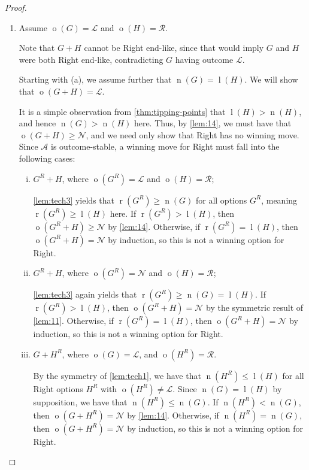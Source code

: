\documentclass[11pt]{article}
\theoremstyle{definition}
\DeclareMathOperator{\outcome}{o}
\newcommand{\set}[1]{\mathcal{#1}}
\DeclareMathOperator{\ltp}{l}
\DeclareMathOperator{\ntp}{n}
\DeclareMathOperator{\rtp}{r}
\begin{document}
\begin{proof}
\begin{enumerate}
        \item Assume $\outcome(G)=\mathscr{L}$ and $\outcome(H)=\mathscr{R}$.

            Note that $G+H$ cannot be Right end-like, since that would imply
            $G$ and $H$ were both Right end-like, contradicting $G$ having
            outcome $\mathscr{L}$.

            Starting with (a), we assume further that $\ntp(G)=\ltp(H)$. We
            will show that $\outcome(G+H)=\mathscr{L}$.

            It is a simple observation from \cref{thm:tipping-points} that
            $\ltp(H)>\ntp(H)$, and hence $\ntp(G)>\ntp(H)$ here. Thus, by
            \cref{lem:14}, we must have that $\outcome(G+H)\geq\mathscr{N}$,
            and we need only show that Right has no winning move. Since
            $\set{A}$ is outcome-stable, a winning move for Right must fall
            into the following cases:
            \begin{enumerate}[i)]
                \item
                    $G^R+H$, where $\outcome(G^R)=\mathscr{L}$ and
                    $\outcome(H)=\mathscr{R}$;

                    \cref{lem:tech3} yields that $\rtp(G^R)\geq\ntp(G)$ for all
                    options $G^R$, meaning $\rtp(G^R)\geq \ltp(H)$ here. If
                    $\rtp(G^R)>\ltp(H)$, then $\outcome(G^R+H)\geq\mathscr{N}$
                    by \cref{lem:14}. Otherwise, if $\rtp(G^R)=\ltp(H)$, then
                    $\outcome(G^R+H)=\mathscr{N}$ by induction, so this is not
                    a winning option for Right.
                \item
                    $G^R+H$, where $\outcome(G^R)=\mathscr{N}$ and
                    $\outcome(H)=\mathscr{R}$;

                    \cref{lem:tech3} again yields that
                    $\rtp(G^R)\geq\ntp(G)=\ltp(H)$. If $\rtp(G^R)>\ltp(H)$,
                    then $\outcome(G^R+H)=\mathscr{N}$ by the symmetric result
                    of \cref{lem:11}. Otherwise, if $\rtp(G^R)=\ltp(H)$, then
                    $\outcome(G^R+H)=\mathscr{N}$ by induction, so this is not
                    a winning option for Right.
                \item
                    $G+H^R$, where $\outcome(G)=\mathscr{L}$, and
                    $\outcome(H^R)=\mathscr{R}$.

                    By the symmetry of \cref{lem:tech1}, we have that
                    $\ntp(H^R)\leq\ltp(H)$ for all Right options $H^R$ with
                    $\outcome(H^R)\neq\mathscr{L}$. Since $\ntp(G)=\ltp(H)$ by
                    supposition, we have that $\ntp(H^R)\leq\ntp(G)$. If
                    $\ntp(H^R)<\ntp(G)$, then $\outcome(G+H^R)=\mathscr{N}$ by
                    \cref{lem:14}. Otherwise, if $\ntp(H^R)=\ntp(G)$, then
                    $\outcome(G+H^R)=\mathscr{N}$ by induction, so this is not
                    a winning option for Right.
            \end{enumerate}


\end{enumerate}
\end{proof}
\end{document}
